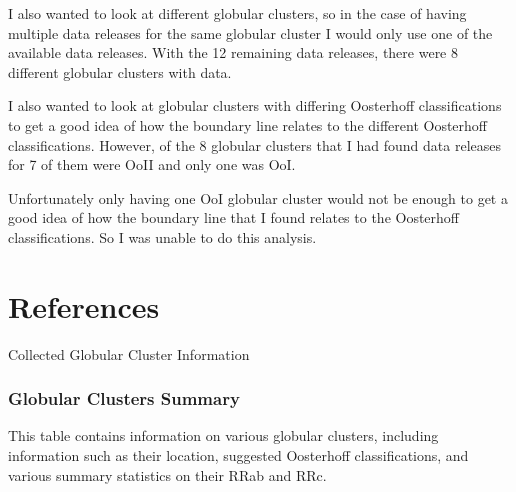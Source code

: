 \documentclass[]{article}
\begin{document}
I also wanted to look at different globular clusters, so in the case of having multiple data releases for the same globular cluster I would only use one of the available data releases. With the 12 remaining data releases, there were 8 different globular clusters with data.

I also wanted to look at globular clusters with differing Oosterhoff classifications to get a good idea of how the boundary line relates to the different Oosterhoff classifications. However, of the 8 globular clusters that I had found data releases for 7 of them were OoII and only one was OoI.

Unfortunately only having one OoI globular cluster would not be enough to get a good idea of how the boundary line that I found relates to the Oosterhoff classifications. So I was unable to do this analysis.

\newpage

\singlespacing

\section{References}

\begingroup
\renewcommand{\section}[2]{}


\endgroup

\newpage

\section{Appendices}

\subsection{Collected Globular Cluster Information}

\subsubsection{Globular Clusters Summary}
\label{sec:app_globular_clusters_summary}

This table contains information on various globular clusters, including information such as their location, suggested Oosterhoff classifications, and various summary statistics on their RRab and RRc.

\vspace{12pt}
\end{document}
